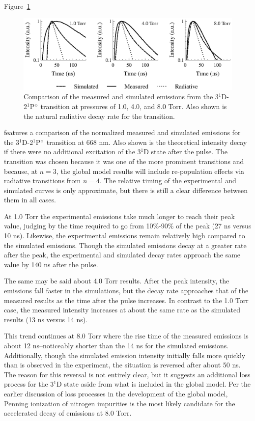 Figure~\ref{fig:667comp}
\begin{figure}
  \centering
  \includegraphics{./chapters/emissions/figures/667comp.eps}
  \caption{Comparison of the measured and simulated emissions from the
  3$^1$D-2$^1$P$^\mathrm{o}$ transition at pressures of 1.0, 4.0, and 8.0 Torr. Also
  shown is the natural radiative decay rate for the transition.}
  \label{fig:667comp}
\end{figure}
features a comparison of the normalized measured and simulated emissions for the
3$^1$D-2$^1$P$^\mathrm{o}$ transition at 668 nm. Also shown is the theoretical
intensity decay if there were no additional excitation of the 3$^1$D state after
the pulse. The transition was chosen because it was one of the more prominent
transitions and because, at $n=3$, the global model results will include
re-population effects via radiative transitions from $n=4$. The relative timing
of the experimental and simulated curves is only approximate, but there is still
a clear difference between them in all cases.

At 1.0 Torr the experimental emissions take much longer to reach their peak
value, judging by the time required to go from 10\%-90\% of the peak (27 ns
versus 10 ns). Likewise, the experimental emissions remain relatively high
compared to the simulated emissions. Though the simulated emissions decay at a
greater rate after the peak, the experimental and simulated decay rates approach
the same value by 140 ns after the pulse.

The same may be said about 4.0 Torr results. After the peak intensity, the
emissions fall faster in the simulations, but the decay rate approaches that of
the measured results as the time after the pulse increases. In contrast to the
1.0 Torr case, the measured intensity increases at about the same rate as the
simulated results (13 ns versus 14 ns).

This trend continues at 8.0 Torr where the rise time of the measured emissions
is about 12 ns--noticeably shorter than the 14 ns for the simulated emissions.
Additionally, though the simulated emission intensity initially falls more
quickly than is observed in the experiment, the situation is reversed after
about 50 ns. The reason for this reversal is not entirely clear, but it suggests
an additional loss process for the 3$^1$D state aside from what is included in
the global model. Per the earlier discussion of loss processes in the
development of the global model, Penning ionization of nitrogen impurities is
the most likely candidate for the accelerated decay of emissions at 8.0 Torr.

